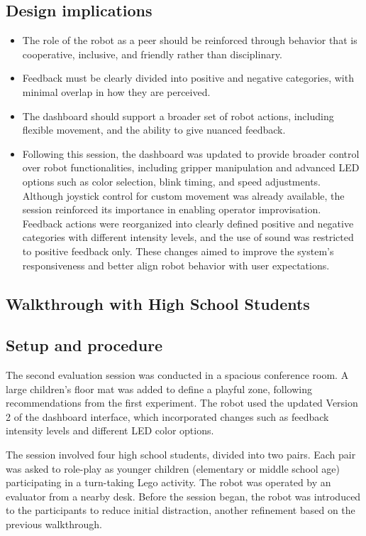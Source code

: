 \documentclass[a4paper]{usiinfbachelorproject}
\begin{document}
\subsection*{\textbf{Design implications}}
\begin{itemize}
    \item The role of the robot as a peer should be reinforced through behavior that is cooperative, inclusive, and friendly rather than disciplinary.
    \item Feedback must be clearly divided into positive and negative categories, with minimal overlap in how they are perceived.
    \item The dashboard should support a broader set of robot actions, including flexible movement, and the ability to give nuanced feedback.
    \item Following this session, the dashboard was updated to provide broader control over robot functionalities, including gripper manipulation and advanced LED options such as color selection, blink timing, and speed adjustments.
          Although joystick control for custom movement was already available, the session reinforced its importance in enabling operator improvisation.
          Feedback actions were reorganized into clearly defined positive and negative categories with different intensity levels, and the use of sound was restricted to positive feedback only.
          These changes aimed to improve the system's responsiveness and better align robot behavior with user expectations.
\end{itemize}

\subsection{\textbf{Walkthrough with High School Students}}
\subsection*{\textbf{Setup and procedure}}
The second evaluation session was conducted in a spacious conference room.
A large children's floor mat was added to define a playful zone, following recommendations from the first experiment.
The robot used the updated Version 2 of the dashboard interface, which incorporated changes such as feedback intensity levels and different LED color options.

The session involved four high school students, divided into two pairs.
Each pair was asked to role-play as younger children (elementary or middle school age) participating in a turn-taking Lego activity.
The robot was operated by an evaluator from a nearby desk.
Before the session began, the robot was introduced to the participants to reduce initial distraction, another refinement based on the previous walkthrough.
\end{document}
